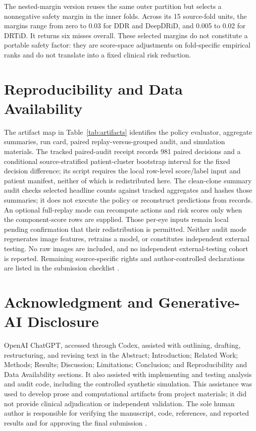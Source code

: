 \documentclass{ieeeaccess}
\begin{document}
The nested-margin version reuses the same outer partition but selects a nonnegative safety margin in the inner folds. Across its 15 source-fold units, the margins range from zero to 0.03 for DDR and DeepDRiD, and 0.005 to 0.02 for DRTiD. It returns six misses overall. These selected margins do not constitute a portable safety factor: they are score-space adjustments on fold-specific empirical ranks and do not translate into a fixed clinical risk reduction.

\section*{Reproducibility and Data Availability}
The artifact map in Table~\ref{tab:artifacts} identifies the policy evaluator, aggregate summaries, run card, paired replay-versus-grouped audit, and simulation materials. The tracked paired-audit receipt records 981 paired decisions and a conditional source-stratified patient-cluster bootstrap interval for the fixed decision difference; its script requires the local row-level score/label input and patient manifest, neither of which is redistributed here. The clean-clone summary audit checks selected headline counts against tracked aggregates and hashes those summaries; it does not execute the policy or reconstruct predictions from records. An optional full-replay mode can recompute actions and risk scores only when the component-score rows are supplied. Those per-eye inputs remain local pending confirmation that their redistribution is permitted. Neither audit mode regenerates image features, retrains a model, or constitutes independent external testing. No raw images are included, and no independent external-testing cohort is reported. Remaining source-specific rights and author-controlled declarations are listed in the submission checklist \cite{openaiChatGPT}.

\section*{Acknowledgment and Generative-AI Disclosure}
OpenAI ChatGPT, accessed through Codex, assisted with outlining, drafting, restructuring, and revising text in the Abstract; Introduction; Related Work; Methods; Results; Discussion; Limitations; Conclusion; and Reproducibility and Data Availability sections. It also assisted with implementing and testing analysis and audit code, including the controlled synthetic simulation. This assistance was used to develop prose and computational artifacts from project materials; it did not provide clinical adjudication or independent validation. The sole human author is responsible for verifying the manuscript, code, references, and reported results and for approving the final submission \cite{openaiChatGPT}.
\end{document}
